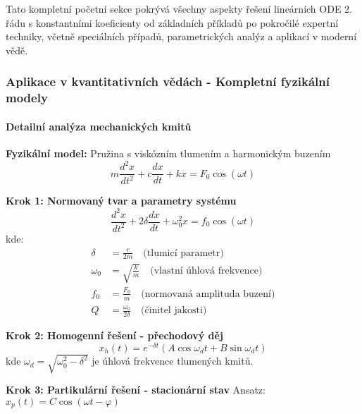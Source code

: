 Tato kompletní početní sekce pokrývá všechny aspekty řešení lineárních ODE 2. řádu s konstantními koeficienty od základních příkladů po pokročilé expertní techniky, včetně speciálních případů, parametrických analýz a aplikací v moderní vědě.

\subsubsection{Aplikace v kvantitativních vědách - Kompletní fyzikální modely}
\label{subsubsec:aplikace-kvantitativni}

\paragraph{Detailní analýza mechanických kmitů}

\begin{example}
\label{ex:kompletni-mechanicky-oscilator}

\noindent\textbf{Fyzikální model:} Pružina s viskózním tlumením a harmonickým buzením
\[
m\frac{d^2x}{dt^2} + c\frac{dx}{dt} + kx = F_0\cos(\omega t)
\]

\vspace{1.5\baselineskip}

\noindent\textbf{Krok 1: Normovaný tvar a parametry systému}
\[
\frac{d^2x}{dt^2} + 2\delta\frac{dx}{dt} + \omega_0^2 x = f_0\cos(\omega t)
\]
kde:
\begin{align*}
\delta &= \frac{c}{2m} \quad \text{(tlumicí parametr)} \\
\omega_0 &= \sqrt{\frac{k}{m}} \quad \text{(vlastní úhlová frekvence)} \\
f_0 &= \frac{F_0}{m} \quad \text{(normovaná amplituda buzení)} \\
Q &= \frac{\omega_0}{2\delta} \quad \text{(činitel jakosti)}
\end{align*}

\vspace{1\baselineskip}

\noindent\textbf{Krok 2: Homogenní řešení - přechodový děj}
\[
x_h(t) = e^{-\delta t}(A\cos\omega_d t + B\sin\omega_d t)
\]
kde $\omega_d = \sqrt{\omega_0^2 - \delta^2}$ je úhlová frekvence tlumených kmitů.

\vspace{1\baselineskip}

\noindent\textbf{Krok 3: Partikulární řešení - stacionární stav}
Ansatz: $x_p(t) = C\cos(\omega t - \varphi)$


\end{example}
